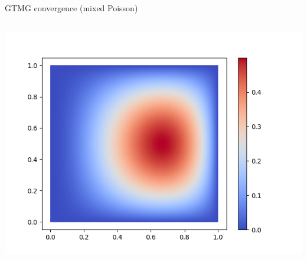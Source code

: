 \documentclass[9pt]{beamer}
\begin{document}
\begin{frame}[c]{GTMG convergence (mixed Poisson)}
\begin{columns}
\begin{column}{0.5\textwidth}
\begin{center}
			\includegraphics[width=0.9\linewidth]{figures/uh}
		\end{center}
	\end{column}
\end{columns}
\end{frame}
\end{document}
